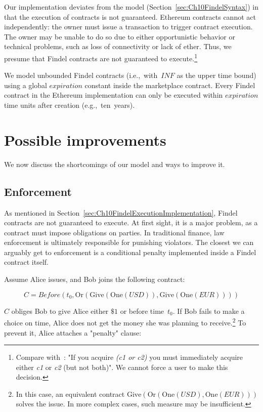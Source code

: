 Our implementation deviates from the model (Section~\ref{sec:Ch10FindelSyntax}) in that the execution of contracts is not guaranteed.
Ethereum contracts cannot act independently: the owner must issue a transaction to trigger contract execution.
The owner may be unable to do so due to either opportunistic behavior or technical problems, such as loss of connectivity or lack of ether.
Thus, we presume that Findel contracts are not guaranteed to execute.\footnote{Compare with~\cite{PeytonJones2000}: "If you acquire \textit{(c1 or c2)} you must immediately acquire either \textit{c1} or \textit{c2} (but not both)". We cannot force a user to make this decision.}

We model unbounded Findel contracts (i.e.,~with~$INF$ as the upper time bound) using a global $expiration$ constant inside the marketplace contract.
Every Findel contract in the Ethereum implementation can only be executed within $expiration$ time units after creation (e.g.,~ten~years).



\section{Possible improvements}

We now discuss the shortcomings of our model and ways to improve it.

\subsection{Enforcement} \label{sec:Ch10FindelEnforcement}

As mentioned in Section~\ref{sec:Ch10FindelExecutionImplementation}, Findel contracts are not guaranteed to execute.
At first sight, it is a major problem, as a contract must impose obligations on parties.
In traditional finance, law enforcement is ultimately responsible for punishing violators.
The closest we can arguably get to enforcement is a conditional penalty implemented inside a Findel contract itself.

Assume Alice issues, and Bob joins the following contract:

\[C=Before(t_0,\mathrm{Or}(\mathrm{Give}(\mathrm{One}(USD)),\mathrm{Give}(\mathrm{One}(EUR))))\]

\(C\) obliges Bob to give Alice either $\$1$ or  before time~$t_0$.
If Bob fails to make a choice on time, Alice does not get the money she was planning to receive.\footnote{In this case, an equivalent contract \(\mathrm{Give}(\mathrm{Or}(\mathrm{One}(USD),\mathrm{One}(EUR)))\) solves the issue. In more complex cases, such measure may be insufficient.}
To prevent it, Alice attaches a "penalty" clause:

